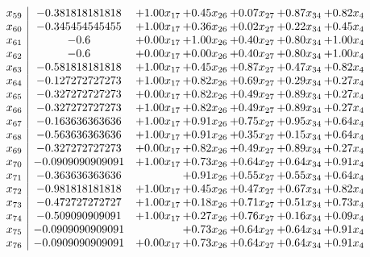 \documentclass[8pt]{article}
\begin{document}
\[\begin{array}{c| c c@{\hskip 2pt} c@{\hskip 2pt} c@{\hskip 2pt} c@{\hskip 2pt} c@{\hskip 2pt} }
 x_{59}   &  -0.381818181818 & +  1.00 x_{17} & +  0.45 x_{26} & +  0.07 x_{27} & +  0.87 x_{34} & +  0.82 x_{4}\\
 x_{60}   &  -0.345454545455 & +  1.00 x_{17} & +  0.36 x_{26} & +  0.02 x_{27} & +  0.22 x_{34} & +  0.45 x_{4}\\
 x_{61}   &  -0.6 & +  0.00 x_{17} & +  1.00 x_{26} & +  0.40 x_{27} & +  0.80 x_{34} & +  1.00 x_{4}\\
 x_{62}   &  -0.6 & +  0.00 x_{17} & +  0.00 x_{26} & +  0.40 x_{27} & +  0.80 x_{34} & +  1.00 x_{4}\\
 x_{63}   &  -0.581818181818 & +  1.00 x_{17} & +  0.45 x_{26} & +  0.87 x_{27} & +  0.47 x_{34} & +  0.82 x_{4}\\
 x_{64}   &  -0.127272727273 & +  1.00 x_{17} & +  0.82 x_{26} & +  0.69 x_{27} & +  0.29 x_{34} & +  0.27 x_{4}\\
 x_{65}   &  -0.327272727273 & +  0.00 x_{17} & +  0.82 x_{26} & +  0.49 x_{27} & +  0.89 x_{34} & +  0.27 x_{4}\\
 x_{66}   &  -0.327272727273 & +  1.00 x_{17} & +  0.82 x_{26} & +  0.49 x_{27} & +  0.89 x_{34} & +  0.27 x_{4}\\
 x_{67}   &  -0.163636363636 & +  1.00 x_{17} & +  0.91 x_{26} & +  0.75 x_{27} & +  0.95 x_{34} & +  0.64 x_{4}\\
 x_{68}   &  -0.563636363636 & +  1.00 x_{17} & +  0.91 x_{26} & +  0.35 x_{27} & +  0.15 x_{34} & +  0.64 x_{4}\\
 x_{69}   &  -0.327272727273 & +  0.00 x_{17} & +  0.82 x_{26} & +  0.49 x_{27} & +  0.89 x_{34} & +  0.27 x_{4}\\
 x_{70}   &  -0.0909090909091 & +  1.00 x_{17} & +  0.73 x_{26} & +  0.64 x_{27} & +  0.64 x_{34} & +  0.91 x_{4}\\
 x_{71}   &  -0.363636363636  &   & +  0.91 x_{26} & +  0.55 x_{27} & +  0.55 x_{34} & +  0.64 x_{4}\\
 x_{72}   &  -0.981818181818 & +  1.00 x_{17} & +  0.45 x_{26} & +  0.47 x_{27} & +  0.67 x_{34} & +  0.82 x_{4}\\
 x_{73}   &  -0.472727272727 & +  1.00 x_{17} & +  0.18 x_{26} & +  0.71 x_{27} & +  0.51 x_{34} & +  0.73 x_{4}\\
 x_{74}   &  -0.509090909091 & +  1.00 x_{17} & +  0.27 x_{26} & +  0.76 x_{27} & +  0.16 x_{34} & +  0.09 x_{4}\\
 x_{75}   &  -0.0909090909091  &   & +  0.73 x_{26} & +  0.64 x_{27} & +  0.64 x_{34} & +  0.91 x_{4}\\
 x_{76}   &  -0.0909090909091 & +  0.00 x_{17} & +  0.73 x_{26} & +  0.64 x_{27} & +  0.64 x_{34} & +  0.91 x_{4}\\

\end{array}\]
\end{document}
